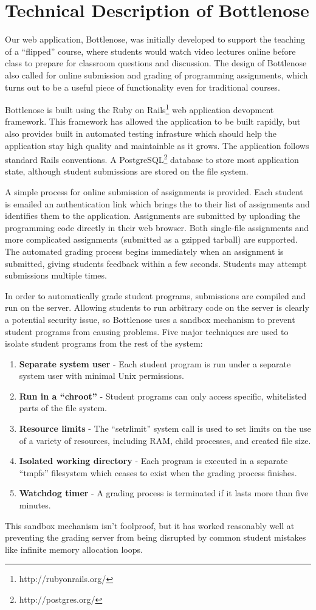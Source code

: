 \documentclass{report}
\begin{document}
\section{Technical Description of Bottlenose}

Our web application, Bottlenose, was initially developed to support
the teaching of a ``flipped'' course, where students would watch video
lectures online before class to prepare for classroom questions and
discussion. The design of Bottlenose also called for online submission
and grading of programming assignments, which turns out to be a useful
piece of functionality even for traditional courses.

Bottlenose is built using the Ruby on
Rails\footnote{http://rubyonrails.org/} web application devopment
framework. This framework has allowed the application to be built
rapidly, but also provides built in automated testing infrasture which
should help the application stay high quality and maintainble as it
grows. The application follows standard Rails conventions. A
PostgreSQL\footnote{http://postgres.org/} database to store most
application state, although student submissions are stored on the file
system.

A simple process for online submission of assignments is
provided. Each student is emailed an authentication link which brings
the to their list of assignments and identifies them to the
application. Assignments are submitted by uploading the programming
code directly in their web browser. Both single-file assignments and
more complicated assignments (submitted as a gzipped tarball) are
supported. The automated grading process begins immediately when an
assignment is submitted, giving students feedback within a few
seconds.  Students may attempt submissions multiple times.

In order to automatically grade student programs, submissions are
compiled and run on the server. Allowing students to run arbitrary
code on the server is clearly a potential security issue, so
Bottlenose uses a sandbox mechanism to prevent student programs from
causing problems. Five major techniques are used to isolate student
programs from the rest of the system:

\begin{enumerate}
\item \textbf{Separate system user} - Each student program is run under
  a separate system user with minimal Unix permissions.
\item \textbf{Run in a ``chroot''} - Student programs can only access
  specific, whitelisted parts of the file system.
\item \textbf{Resource limits} - The ``setrlimit'' system call is used to
  set limits on the use of a variety of resources, including RAM, child
  processes, and created file size.
\item \textbf{Isolated working directory} - Each program is executed in
  a separate ``tmpfs'' filesystem which ceases to exist when the grading
  process finishes.
\item \textbf{Watchdog timer} - A grading process is terminated if it lasts
  more than five minutes.
\end{enumerate}

This sandbox mechanism isn't foolproof, but it has worked reasonably
well at preventing the grading server from being disrupted by common
student mistakes like infinite memory allocation loops.
\end{document}
